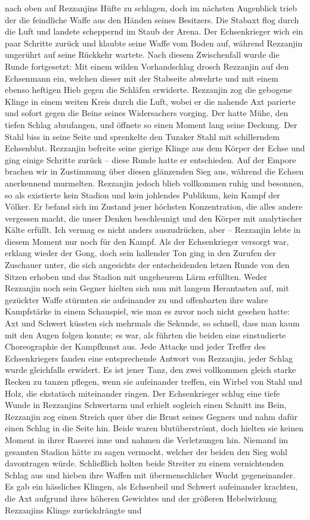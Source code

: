 nach oben auf Rezzanjins Hüfte zu schlagen, doch im nächsten Augenblick trieb der die feindliche Waffe aus den Händen seines Besitzers. Die Stabaxt flog durch die Luft und landete scheppernd im Staub der Arena. Der Echsenkrieger wich ein paar Schritte zurück und klaubte seine Waffe vom Boden auf, während Rezzanjin ungerührt auf seine Rückkehr wartete. Nach diesem Zwischenfall wurde die Runde fortgesetzt: Mit einem wilden Vorhandschlag drosch Rezzanjin auf den Echsenmann ein, welchen dieser mit der Stabseite abwehrte und mit einem ebenso heftigen Hieb gegen die Schläfen erwiderte. Rezzanjin zog die gebogene Klinge in einem weiten Kreis durch die Luft, wobei er die nahende Axt parierte und sofort gegen die Beine seines Widersachers vorging. Der hatte Mühe, den tiefen Schlag abzufangen, und öffnete so einen Moment lang seine Deckung. Der Stahl biss in seine Seite und sprenkelte den Tuzaker Stahl mit schillerndem Echsenblut. Rezzanjin befreite seine gierige Klinge aus dem Körper der Echse und ging einige Schritte zurück -- diese Runde hatte er entschieden. Auf der Empore brachen wir in Zustimmung über diesen glänzenden Sieg aus, während die Echsen anerkennend murmelten. Rezzanjin jedoch blieb vollkommen ruhig und besonnen, so als existierte kein Stadion und kein johlendes Publikum, kein Kampf der Völker. Er befand sich im Zustand jener höchsten Konzentration, die alles andere vergessen macht, die unser Denken beschleunigt und den Körper mit analytischer Kälte erfüllt. Ich vermag es nicht anders auszudrücken, aber -- Rezzanjin lebte in diesem Moment nur noch für den Kampf. Als der Echsenkrieger versorgt war, erklang wieder der Gong, doch sein hallender Ton ging in den Zurufen der Zuschauer unter, die sich angesichts der entscheidenden letzen Runde von den Sitzen erhoben und das Stadion mit ungeheurem Lärm erfüllten. Weder Rezzanjin noch sein Gegner hielten sich nun mit langem Herantasten auf, mit gezückter Waffe stürmten sie aufeinander zu und offenbarten ihre wahre Kampfstärke in einem Schauspiel, wie man es zuvor noch nicht gesehen hatte: Axt und Schwert küssten sich mehrmals die Sekunde, so schnell, dass man kaum mit den Augen folgen konnte; es war, als führten die beiden eine einstudierte Choreographie der Kampfkunst aus. Jede Attacke und jeder Treffer des Echsenkriegers fanden eine entsprechende Antwort von Rezzanjin, jeder Schlag wurde gleichfalls erwidert. Es ist jener Tanz, den zwei vollkommen gleich starke Recken zu tanzen pflegen, wenn sie aufeinander treffen, ein Wirbel von Stahl und Holz, die ekstatisch miteinander ringen. Der Echsenkrieger schlug eine tiefe Wunde in Rezzanjins Schwertarm und erhielt sogleich einen Schnitt ins Bein, Rezzanjin zog einen Streich quer über die Brust seines Gegners und nahm dafür einen Schlag in die Seite hin. Beide waren blutüberströmt, doch hielten sie keinen Moment in ihrer Raserei inne und nahmen die Verletzungen hin. Niemand im gesamten Stadion hätte zu sagen vermocht, welcher der beiden den Sieg wohl davontragen würde. Schließlich holten beide Streiter zu einem vernichtenden Schlag aus und hieben ihre Waffen mit übermenschlicher Wucht gegeneinander. Es gab ein hässliches Klingen, als Echsenbeil und Schwert aufeinander krachten, die Axt aufgrund ihres höheren Gewichtes und der größeren Hebelwirkung Rezzanjins Klinge zurückdrängte und 